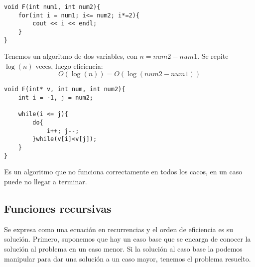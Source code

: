 \begin{ejemplo}
\begin{listing}[H]
\begin{verbatim}
void F(int num1, int num2){
    for(int i = num1; i<= num2; i*=2){
        cout << i << endl;
    }
}
\end{verbatim}
\end{listing}
Tenemos un algoritmo de dos variables, con $n = num2- num1$. Se repite $\log(n)$ veces, luego eficiencia:
\begin{equation*}
O(\log(n)) = O(\log(num2-num1))
\end{equation*}
\end{ejemplo}

\begin{ejemplo}
\begin{listing}[H]
\begin{verbatim}
void F(int* v, int num, int num2){
    int i = -1, j = num2;
    
    while(i <= j){
        do{
            i++; j--;
        }while(v[i]<v[j]);
    }
}
\end{verbatim}
\end{listing}
Es un algoritmo que no funciona correctamente en todos los cacos, en un caso puede no llegar a terminar.
\end{ejemplo}

\subsection{Funciones recursivas}
Se expresa como una ecuación en recurrencias y el orden de eficiencia es su solución.
Primero, suponemos que hay un caso base que se encarga de conocer la solución al problema en un caso menor.
Si la solución al caso base la podemos manipular para dar una solución a un caso mayor, tenemos el problema resuelto.

